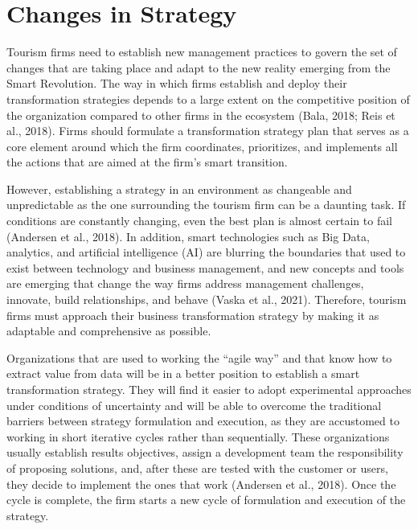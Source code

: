 \documentclass[
  letterpaper,
  DIV=11,
  numbers=noendperiod]{scrreprt}
\begin{document}
\hypertarget{changes-in-strategy}{%
\section{Changes in Strategy}\label{changes-in-strategy}}

Tourism firms need to establish new management practices to govern the
set of changes that are taking place and adapt to the new reality
emerging from the Smart Revolution. The way in which firms establish and
deploy their transformation strategies depends to a large extent on the
competitive position of the organization compared to other firms in the
ecosystem (Bala, 2018; Reis et al., 2018). Firms should formulate a
transformation strategy plan that serves as a core element around which
the firm coordinates, prioritizes, and implements all the actions that
are aimed at the firm's smart transition.

However, establishing a strategy in an environment as changeable and
unpredictable as the one surrounding the tourism firm can be a daunting
task. If conditions are constantly changing, even the best plan is
almost certain to fail (Andersen et al., 2018). In addition, smart
technologies such as Big Data, analytics, and artificial intelligence
(AI) are blurring the boundaries that used to exist between technology
and business management, and new concepts and tools are emerging that
change the way firms address management challenges, innovate, build
relationships, and behave (Vaska et al., 2021). Therefore, tourism firms
must approach their business transformation strategy by making it as
adaptable and comprehensive as possible.

Organizations that are used to working the ``agile way'' and that know
how to extract value from data will be in a better position to establish
a smart transformation strategy. They will find it easier to adopt
experimental approaches under conditions of uncertainty and will be able
to overcome the traditional barriers between strategy formulation and
execution, as they are accustomed to working in short iterative cycles
rather than sequentially. These organizations usually establish results
objectives, assign a development team the responsibility of proposing
solutions, and, after these are tested with the customer or users, they
decide to implement the ones that work (Andersen et al., 2018). Once the
cycle is complete, the firm starts a new cycle of formulation and
execution of the strategy.
\end{document}
